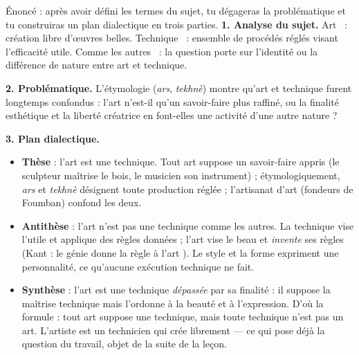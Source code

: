 \documentclass[11pt]{article}
\begin{document}
\begin{exoresolu}
Énoncé : après avoir défini les termes du sujet, tu dégageras la problématique et tu construiras un plan dialectique en trois parties.
\tcblower
\textbf{1. Analyse du sujet.} \guillemotleft Art \guillemotright\ : création libre d'œuvres belles. \guillemotleft Technique \guillemotright\ : ensemble de procédés réglés visant l'efficacité utile. \guillemotleft Comme les autres \guillemotright\ : la question porte sur l'identité ou la différence de nature entre art et technique.

\textbf{2. Problématique.} L'étymologie (\emph{ars}, \emph{tekhnè}) montre qu'art et technique furent longtemps confondus : l'art n'est-il qu'un savoir-faire plus raffiné, ou la finalité esthétique et la liberté créatrice en font-elles une activité d'une autre nature ?

\textbf{3. Plan dialectique.}
\begin{itemize}
\item \textbf{Thèse} : l'art est une technique. Tout art suppose un savoir-faire appris (le sculpteur maîtrise le bois, le musicien son instrument) ; étymologiquement, \emph{ars} et \emph{tekhnè} désignent toute production réglée ; l'artisanat d'art (fondeurs de Foumban) confond les deux.
\item \textbf{Antithèse} : l'art n'est pas une technique comme les autres. La technique vise l'utile et applique des règles données ; l'art vise le beau et \emph{invente} ses règles (Kant : le génie \guillemotleft donne la règle à l'art \guillemotright). Le style et la forme expriment une personnalité, ce qu'aucune exécution technique ne fait.
\item \textbf{Synthèse} : l'art est une technique \emph{dépassée} par sa finalité : il suppose la maîtrise technique mais l'ordonne à la beauté et à l'expression. D'où la formule : tout art suppose une technique, mais toute technique n'est pas un art. L'artiste est un technicien qui crée librement — ce qui pose déjà la question du travail, objet de la suite de la leçon.
\end{itemize}
\end{exoresolu}
\end{document}
